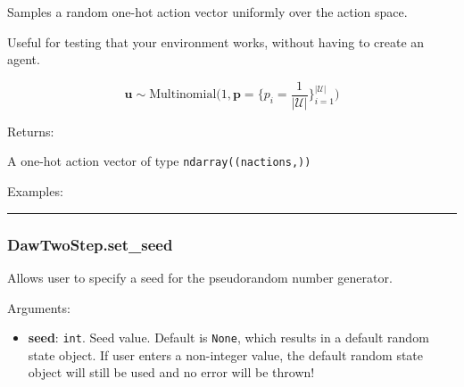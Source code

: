 \begin{Shaded}
\begin{Highlighting}[]
\NormalTok{)}
\end{Highlighting}
\end{Shaded}

Samples a random one-hot action vector uniformly over the action space.

Useful for testing that your environment works, without having to create
an agent.

\[
\mathbf u \sim \mathrm{Multinomial}\Big(1, \mathbf p=\{p_i = \frac{1}{|\mathcal U|}\}_{i=1}^{|\mathcal U|}\Big)
\]

Returns:

A one-hot action vector of type \texttt{ndarray((nactions,))}

Examples:

\begin{Shaded}
\begin{Highlighting}[]
\OperatorTok{=}
\end{Highlighting}
\end{Shaded}

\begin{center}\rule{0.5\linewidth}{\linethickness}\end{center}

\subsubsection{DawTwoStep.set\_seed}\label{dawtwostep.set_seed}

\begin{Shaded}
\begin{Highlighting}[]
\OperatorTok{=}\NormalTok{)}
\end{Highlighting}
\end{Shaded}

Allows user to specify a seed for the pseudorandom number generator.

Arguments:

\begin{itemize}
\tightlist
\item
  \textbf{seed}: \texttt{int}. Seed value. Default is \texttt{None},
  which results in a default random state object. If user enters a
  non-integer value, the default random state object will still be used
  and no error will be thrown!
\end{itemize}

